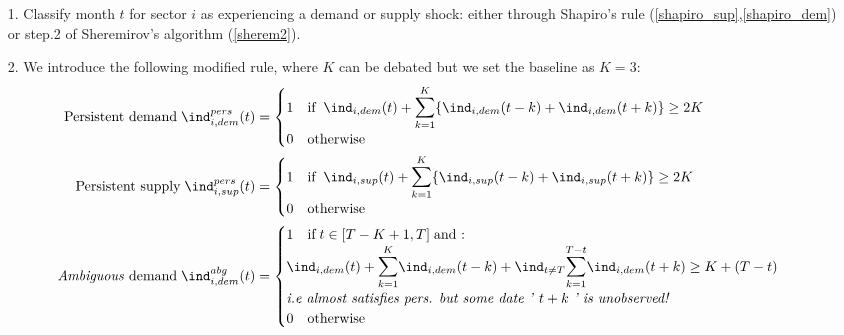 \begin{itemize}
    \item[1.] Classify month $t$ for sector $i$ as experiencing a demand or supply shock: either through Shapiro's rule (\ref{shapiro_sup},\ref{shapiro_dem}) or step.2 of Sheremirov's algorithm (\ref{sherem2}).
    \item[2.] We introduce the following modified rule, where $K$ can be debated but we set the baseline as $K=3$:
    \begin{align*}
        \textrm{Persistent demand} \; \ind_{i,dem}^{pers}(t) &= \begin{cases} 1 \quad \textrm{if} \; \; \ind_{i,dem}(t) + \mathlarger{\mathlarger{\sum}}_{k=1}^{K} \{ \ind_{i,dem}(t-k)+\ind_{i,dem}(t+k) \} \geq 2K \\ 0 \quad \textrm{otherwise} \end{cases} \\ 
        \textrm{Persistent supply} \; \ind_{i,sup}^{pers}(t) &= \begin{cases} 1 \quad \textrm{if} \; \; \ind_{i,sup}(t) + \mathlarger{\mathlarger{\sum}}_{k=1}^{K} \{ \ind_{i,sup}(t-k)+\ind_{i,sup}(t+k) \} \geq 2K \\ 0 \quad \textrm{otherwise} \end{cases} \\ 
        \textrm{\textit{Ambiguous} demand} \; \ind_{i,dem}^{abg}(t) &= \begin{cases} 1 \quad \textrm{if} \; t\in [T-K+1,T] \; \textrm{and :}\\ \ind_{i,dem}(t) + \mathlarger{\mathlarger{\sum}}_{k=1}^{K} \ind_{i,dem}(t-k) + \ind_{t\neq T}\mathlarger{\mathlarger{\sum}}_{k=1}^{T-t}\ind_{i,dem}(t+k) \geq K+(T-t) \\ \textrm{\textit{i.e almost satisfies pers. but some date '} $t+k$ \textit{' is unobserved!}} \\ 0 \quad \textrm{otherwise} \end{cases} \\ 

\end{align*}
\end{itemize}
